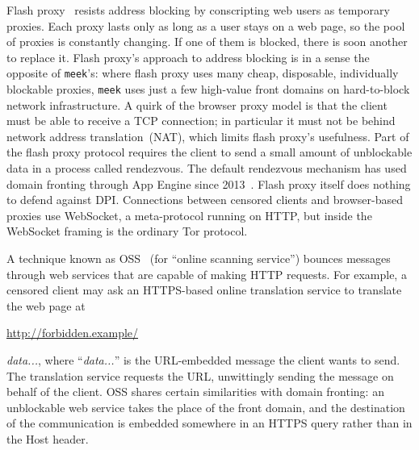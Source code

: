 \documentclass[conference]{IEEEtran}
\newcommand{\meek}{\texttt{meek}\xspace}
\def\urll#1{\begin{NoHyper}\url{#1}\end{NoHyper}}
\begin{document}
Flash proxy~\cite{flashproxy} resists address blocking by
conscripting web users as temporary proxies.
Each proxy lasts only as long as a
user stays on a web page, so the pool of proxies is constantly changing.
If one of them is blocked, there is soon another to replace it.
Flash proxy's approach to address blocking is in a sense
the opposite of \meek's:
where flash proxy uses many cheap, disposable, individually blockable proxies,
\meek uses just a few high-value front domains on hard-to-block network infrastructure.
A quirk of the browser proxy model is that
the client must be able to receive a TCP connection; in particular it
must not be behind network address translation~(NAT), which limits flash proxy's usefulness.
Part of the flash proxy protocol requires the client to send
a small amount of unblockable data in a process called rendezvous.
The default rendezvous mechanism has used domain fronting through App Engine since 2013~\cite{flashproxy-reg-appspot}.
Flash proxy itself does nothing to defend against DPI.
Connections between censored clients and browser-based proxies use
WebSocket, a meta-protocol running on HTTP,
but inside the WebSocket framing is the ordinary Tor protocol.

A technique known as OSS~\cite{oss} (for
``online scanning service'') bounces messages
through web services that are capable of making HTTP requests.
For example, a censored client may ask an HTTPS-based online translation service to
translate the web page at \urll{http://forbidden.example/}\textsl{data...},
where ``\textsl{data...}'' is the URL-embedded message the client wants to send.
The translation service requests the URL,
unwittingly sending the message on behalf of the client.
OSS shares certain similarities with domain fronting:
an unblockable web service takes the place of the front domain,
and the destination of the communication is embedded somewhere in an HTTPS query
rather than in the Host header.
\end{document}
